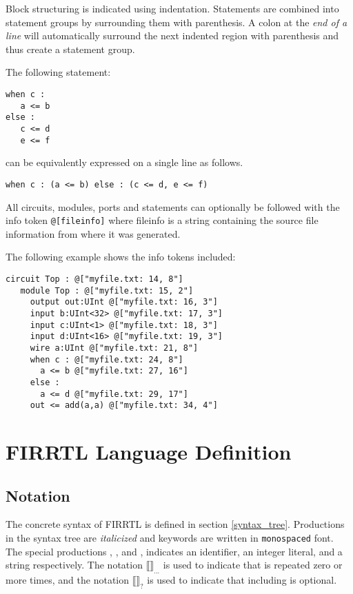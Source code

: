 \documentclass[12pt]{article}
\begin{document}
Block structuring is indicated using indentation. Statements are combined into statement groups by surrounding them with parenthesis. A colon at the {\em end of a line} will automatically surround the next indented region with parenthesis and thus create a statement group.

The following statement:
\begin{verbatim}
when c :
   a <= b
else :
   c <= d
   e <= f
\end{verbatim}
can be equivalently expressed on a single line as follows.
\begin{verbatim}
when c : (a <= b) else : (c <= d, e <= f)
\end{verbatim}

All circuits, modules, ports and statements can optionally be followed with the info token \verb|@[fileinfo]| where fileinfo is a string containing the source file information from where it was generated.

The following example shows the info tokens included:

\begin{verbatim}
circuit Top : @["myfile.txt: 14, 8"] 
   module Top : @["myfile.txt: 15, 2"]
     output out:UInt @["myfile.txt: 16, 3"]
     input b:UInt<32> @["myfile.txt: 17, 3"]
     input c:UInt<1> @["myfile.txt: 18, 3"]
     input d:UInt<16> @["myfile.txt: 19, 3"]
     wire a:UInt @["myfile.txt: 21, 8"]
     when c : @["myfile.txt: 24, 8"]
       a <= b @["myfile.txt: 27, 16"]
     else :
       a <= d @["myfile.txt: 29, 17"]
     out <= add(a,a) @["myfile.txt: 34, 4"]
\end{verbatim}

\section{FIRRTL Language Definition}
\newcommand{\pipe}{\textbar}
\newcommand{\opt}[1]{$\llbracket$#1$\rrbracket_?$}
\newcommand{\rpt}[1]{$\llbracket$#1$\rrbracket_{...}$}
\subsection{Notation}
The concrete syntax of FIRRTL is defined in section \ref{syntax_tree}. Productions in the syntax tree are {\em italicized} and keywords are written in \verb|monospaced| font. The special productions , , and , indicates an identifier, an integer literal, and a string respectively. The notation \rpt{} is used to indicate that  is repeated zero or more times, and the notation \opt{} is used to indicate that including  is optional.
\end{document}
